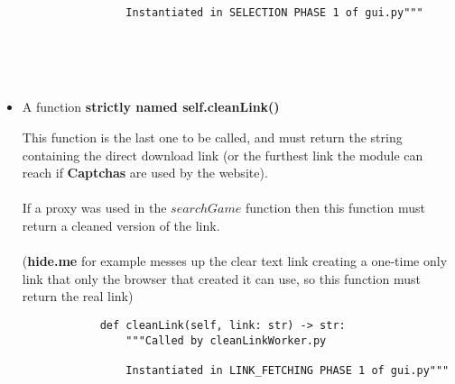 \documentclass{article}
\begin{document}
\begin{itemize}
\begin{verbatim}
                Instantiated in SELECTION PHASE 1 of gui.py"""
        \end{verbatim}
        \phantom{Spooky} \\ \\ \\
        \item A function \textbf{strictly named self.cleanLink()}
        
        This function is the last one to be called, and must return the string containing the direct download link (or the furthest link the module can reach if \textbf{Captchas} are used by the website). \\ \\
        If a proxy was used in the $searchGame$ function then this function must return a cleaned version of the link. \\ \\
        (\textbf{hide.me} for example messes up the clear text link creating a one-time only link that only the browser that created it can use, so this function must return the real link)
        \begin{verbatim}
            def cleanLink(self, link: str) -> str:
                """Called by cleanLinkWorker.py
        
                Instantiated in LINK_FETCHING PHASE 1 of gui.py"""
        \end{verbatim}
    \end{itemize}
\end{document}
